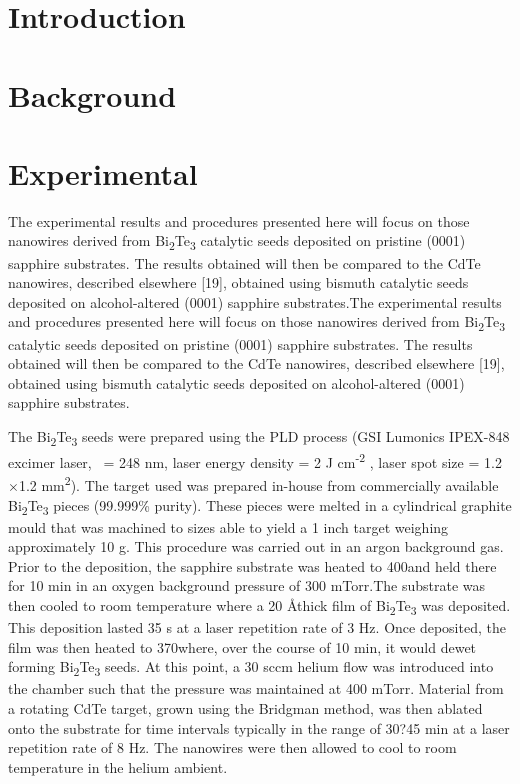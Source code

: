 \section{Introduction}

\section{Background}

\section{Experimental}
The experimental results and procedures presented here will
focus on those nanowires derived from Bi\textsubscript{2}Te\textsubscript{3} catalytic seeds
deposited on pristine (0001) sapphire substrates. The results
obtained will then be compared to the CdTe nanowires,
described elsewhere [19], obtained using bismuth catalytic
seeds deposited on alcohol-altered (0001) sapphire substrates.The experimental results and procedures presented here will
focus on those nanowires derived from Bi\textsubscript{2}Te\textsubscript{3} catalytic seeds
deposited on pristine (0001) sapphire substrates. The results
obtained will then be compared to the CdTe nanowires,
described elsewhere [19], obtained using bismuth catalytic
seeds deposited on alcohol-altered (0001) sapphire substrates.

The Bi\textsubscript{2}Te\textsubscript{3} seeds were prepared using the PLD process
(GSI Lumonics IPEX-848 excimer laser, \textlambda~= 248 nm, laser
energy density = 2 J cm\textsuperscript{-2} , laser spot size = 1.2$\times$1.2 mm\textsuperscript{2}).
The target used was prepared in-house from commercially
available Bi\textsubscript{2}Te\textsubscript{3} pieces (99.999\% purity). These pieces were
melted in a cylindrical graphite mould that was machined to
sizes able to yield a 1 inch target weighing approximately 10 g. This procedure was carried out in an argon background gas. Prior to the deposition, the sapphire substrate was heated to 
400\degree\celsius and held there for 10 min in an oxygen background 
pressure of 300 mTorr.The substrate was then cooled to room temperature where a 20 \AA thick film of Bi\textsubscript{2}Te\textsubscript{3} was deposited. This deposition lasted 35 s at a laser repetition rate of 3 Hz. 
Once deposited, the film was then heated to 370\degree\celsius where, over 
the course of 10 min, it would dewet forming Bi\textsubscript{2}Te\textsubscript{3} 
seeds. At this point, a 30 sccm helium flow was introduced 
into the chamber such that the pressure was maintained at 
400 mTorr. Material from a rotating CdTe target, grown using 
the Bridgman method, was then ablated onto the substrate for 
time intervals typically in the range of 30?45 min at a laser 
repetition rate of 8 Hz. The nanowires were then allowed to 
cool to room temperature in the helium ambient.

